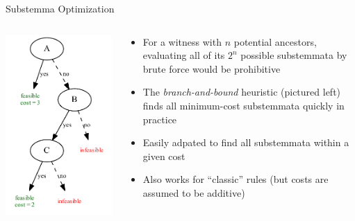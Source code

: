 \documentclass[10pt]{beamer}
\begin{document}
	\begin{frame}{Substemma Optimization}
		\begin{columns}
			\begin{column}{0.4\textwidth}
				\includegraphics[width=\textwidth]{../graphics/branch-and-bound-example.pdf}
			\end{column}
			\begin{column}{0.55\textwidth}
				\begin{itemize}
					\item For a witness with $n$ potential ancestors, evaluating all of its $2^n$ possible substemmata by brute force would be prohibitive
					\item The \emph{branch-and-bound} heuristic (pictured left) finds all minimum-cost substemmata quickly in practice
					\item Easily adpated to find all substemmata within a given cost
					\item Also works for ``classic'' rules (but costs are assumed to be additive)
				\end{itemize}
			\end{column}
		\end{columns}
	\end{frame}
\end{document}
